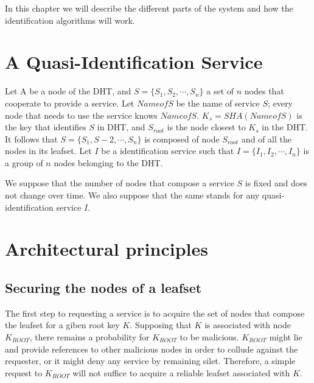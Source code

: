 
In this chapter we will describe the different parts of the system and how the
identification algorithms will work.

\section{A Quasi-Identification Service}


Let A be a node of the DHT, and $S = \{S_1, S_2, \cdots, S_n\}$ a set of $n$
nodes that cooperate to provide a service. Let $NameofS$ be the name of service
$S$; every node that needs to use the service knows $NameofS$. $K_s =
SHA(NameofS)$ is the key that identifies $S$ in DHT, and $S_{root}$ is the node
closest to $K_s$ in the DHT. It follows that $S = \{S_1, S-2, \cdots, S_n\}$ is
composed of node $S_{root}$ and of all the nodes in its leafset. Let $I$ be a
identification service such that $I = \{ I_1, I_2, \cdots, I_n\}$ is a group of
$n$ nodes belonging to the DHT. 


We suppose that the number of nodes that compose a service $S$ is fixed and does
not change over time. We also suppose that the same stands for any
quasi-identification service $I$.




\section{Architectural principles}

\subsection{Securing the nodes of a leafset}

The first step to requesting a service is to acquire the set of nodes that
compose the leafset for a giben root key $K$. Supposing that $K$ is associated
with node $K_{ROOT}$, there remains a probability for $K_{ROOT}$ to be
malicious. $K_{ROOT}$ might lie and provide references to other malicious nodes
in order to collude against the requester, or it might deny any service by
remaining silet. Therefore, a simple request to $K_{ROOT}$ will not suffice to
acquire a reliable leafset associated with $K$.


